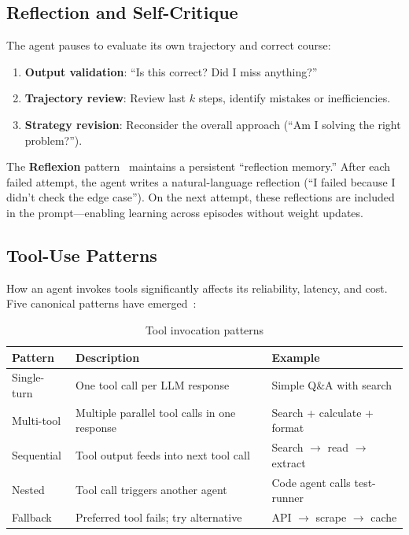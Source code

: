 \subsection{Reflection and Self-Critique}
\label{reflection-and-self-critique}

The agent pauses to evaluate its own trajectory and correct course:

\begin{enumerate}
  \item \textbf{Output validation}: ``Is this correct? Did I miss anything?''
  \item \textbf{Trajectory review}: Review last $k$ steps, identify mistakes or inefficiencies.
  \item \textbf{Strategy revision}: Reconsider the overall approach (``Am I solving the right problem?'').
\end{enumerate}

\begin{intuitionbox}
The \textbf{Reflexion} pattern~\cite{shinn2023reflexion} maintains a persistent ``reflection memory.'' After each failed attempt, the agent writes a natural-language reflection (``I failed because I didn’t check the edge case''). On the next attempt, these reflections are included in the prompt---enabling learning across episodes without weight updates.
\end{intuitionbox}

\subsection{Tool-Use Patterns}
\label{tool-use-patterns}

How an agent invokes tools significantly affects its reliability, latency, and cost. Five canonical patterns have emerged~\cite{schick2023toolformer}:

\begin{table}[ht!]
\centering
\caption{Tool invocation patterns}
\begin{tabular}{@{}lp{5cm}p{8cm}@{}}
\toprule
\textbf{Pattern} & \textbf{Description} & \textbf{Example} \\
\midrule
Single-turn & One tool call per LLM response & Simple Q\&A with search \\
Multi-tool & Multiple parallel tool calls in one response & Search + calculate + format \\
Sequential & Tool output feeds into next tool call & Search $\to$ read $\to$ extract \\
Nested & Tool call triggers another agent & Code agent calls test-runner \\
Fallback & Preferred tool fails; try alternative & API $\to$ scrape $\to$ cache \\
\bottomrule
\end{tabular}
\end{table}

